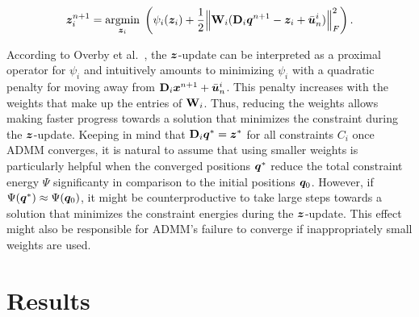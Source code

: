 \begin{equation}\label{eq:admm-z-update-copy}
    \bm{z}_i^{n+1} = \underset{\bm{z}_i}{\operatorname{argmin}}\; \left (\psi_i(\bm{z}_i) + \frac{1}{2}\norm{\mathbf{W}_i(\mathbf{D}_i\bm{q}^{n+1} - \bm{z}_i + \bar{\bm{u}}^i_n)}^2_F \right ).
\end{equation}

\noindent According to Overby et al.\ \cite{overby2017}, the $\bm{z}$-update can be interpreted as a proximal operator for $\psi_i$ and intuitively amounts to 
minimizing $\psi_i$ with a quadratic penalty for moving away from $\mathbf{D}_i\bm{x}^{n+1}+ \bar{\bm{u}}^i_n$. This penalty increases with the weights that make 
up the entries of $\mathbf{W}_i$. Thus, reducing the weights allows making faster progress towards a solution that minimizes the constraint during 
the $\bm{z}$-update. Keeping in mind that $\mathbf{D}_i\bm{q}^* = \bm{z}^*$ for all constraints $C_i$ once ADMM converges, it is natural to assume that using smaller
weights is particularly helpful when the converged positions $\bm{q}^*$ reduce the total constraint energy $\Psi$ significanty in comparison to the initial positions 
$\bm{q}_0$. However, if $\Psi(\bm{q}^*) \approx \Psi(\bm{q}_0)$, it might be counterproductive to take large steps towards a solution that minimizes the constraint 
energies during the $\bm{z}$-update. This effect might also be responsible for ADMM's failure to converge if inappropriately small weights are used.

\section{Results}

